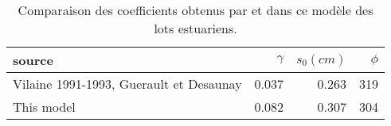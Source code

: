 \begin{table}[htbp]
\centering
\caption{Comparaison des coefficients obtenus par \citet{desaunay_seasonal_1997} et dans ce modèle des lots estuariens.} 
\label{resumé_cyclique}
\begin{tabularx}{0.6\textwidth}{lrrr}
  \hline
source & $\gamma$ & $s_0(cm)$ & $\phi$ \\ 
  \hline
Vilaine 1991-1993, Guerault et Desaunay & 0.037 & 0.263 & 319 \\ 
  This model & 0.082 & 0.307 & 304 \\ 
   \hline
\end{tabularx}
\end{table}
